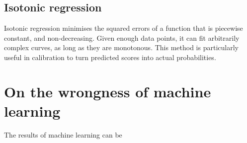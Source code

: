\subsection{Isotonic regression}
Isotonic regression minimises the squared errors of a function that is piecewise constant, and non-decreasing.
Given enough data points, it can fit arbitrarily complex curves, as long as they are monotonous.
This method is particularly useful in calibration to turn predicted scores into actual probabilities.

\begin{center}
\end{center}



\section{On the wrongness of machine learning}\label{sec:wrong}
The results of machine learning can be 
